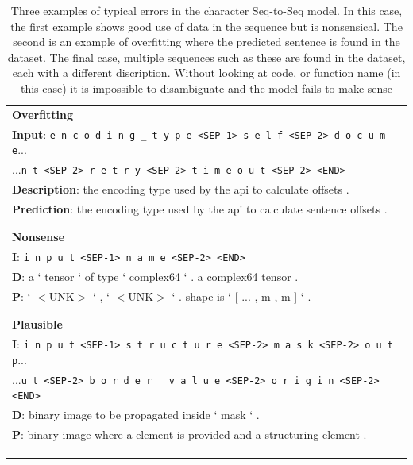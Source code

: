 \begin{table}[ht!]
\begin{center}
\begin{tabular}{ l  }


\textbf{Overfitting}\\

\textbf{Input}: \texttt{e n c o d i n g _ t y p e <SEP-1> s e l f <SEP-2> d o c u m e}...\\
...\texttt{n t <SEP-2> r e t r y <SEP-2> t i m e o u t <SEP-2> <END>}\\
\textbf{Description}: the encoding type used by the api to calculate offsets .\\
\textbf{Prediction}: the encoding type used by the api to calculate sentence offsets . \\
\\\hline\\

\textbf{Nonsense}\\

\textbf{I}: \texttt{i n p u t <SEP-1> n a m e <SEP-2> <END>}\\
\textbf{D}: a ` tensor ` of type ` complex64 ` . a complex64 tensor .\\
\textbf{P}: ` $<$UNK$>$ ` , ` $<$UNK$>$ ` . shape is ` [ ... , m , m ] ` . \\
\\\hline\\

\textbf{Plausible}\\

\textbf{I}: \texttt{i n p u t <SEP-1> s t r u c t u r e <SEP-2> m a s k <SEP-2> o u t p}...\\
...\texttt{u t <SEP-2> b o r d e r _ v a l u e <SEP-2> o r i g i n <SEP-2> <END>}\\
\textbf{D}: binary image to be propagated inside ` mask ` .\\
\textbf{P}: binary image where a element is provided and a structuring element .\\
\\\hline\\

\\

\end{tabular}
\caption{Three examples of typical errors in the character Seq-to-Seq model.  In this case, the first example shows good use of data in the sequence but is nonsensical. The second is an example of overfitting where the predicted sentence is found in the dataset. The final case, multiple sequences such as these are found in the dataset, each with a different discription. Without looking at code, or function name (in this case) it is impossible to disambiguate and the model fails to make sense }
\label{table:typicalvarotherargs}
\end{center}
\end{table}

